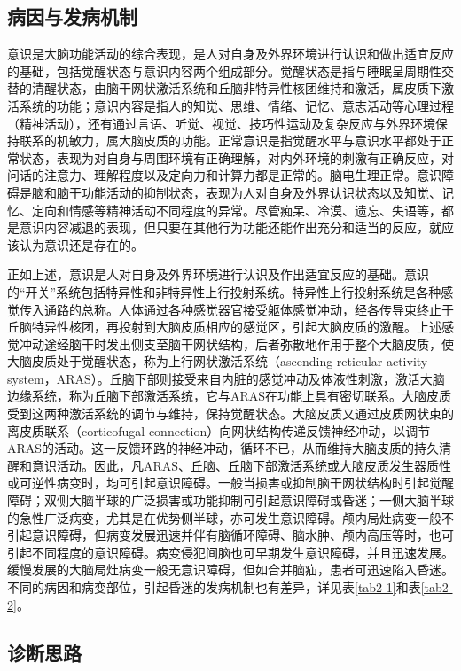 \subsection{病因与发病机制}

意识是大脑功能活动的综合表现，是人对自身及外界环境进行认识和做出适宜反应的基础，包括觉醒状态与意识内容两个组成部分。觉醒状态是指与睡眠呈周期性交替的清醒状态，由脑干网状激活系统和丘脑非特异性核团维持和激活，属皮质下激活系统的功能；意识内容是指人的知觉、思维、情绪、记忆、意志活动等心理过程（精神活动），还有通过言语、听觉、视觉、技巧性运动及复杂反应与外界环境保持联系的机敏力，属大脑皮质的功能。正常意识是指觉醒水平与意识水平都处于正常状态，表现为对自身与周围环境有正确理解，对内外环境的刺激有正确反应，对问话的注意力、理解程度以及定向力和计算力都是正常的。脑电生理正常。意识障碍是脑和脑干功能活动的抑制状态，表现为人对自身及外界认识状态以及知觉、记忆、定向和情感等精神活动不同程度的异常。尽管痴呆、冷漠、遗忘、失语等，都是意识内容减退的表现，但只要在其他行为功能还能作出充分和适当的反应，就应该认为意识还是存在的。

正如上述，意识是人对自身及外界环境进行认识及作出适宜反应的基础。意识的“开关”系统包括特异性和非特异性上行投射系统。特异性上行投射系统是各种感觉传入通路的总称。人体通过各种感觉器官接受躯体感觉冲动，经各传导束终止于丘脑特异性核团，再投射到大脑皮质相应的感觉区，引起大脑皮质的激醒。上述感觉冲动途经脑干时发出侧支至脑干网状结构，后者弥散地作用于整个大脑皮质，使大脑皮质处于觉醒状态，称为上行网状激活系统（ascending
reticular activity
system，ARAS）。丘脑下部则接受来自内脏的感觉冲动及体液性刺激，激活大脑边缘系统，称为丘脑下部激活系统，它与ARAS在功能上具有密切联系。大脑皮质受到这两种激活系统的调节与维持，保持觉醒状态。大脑皮质又通过皮质网状束的离皮质联系（corticofugal
connection）向网状结构传递反馈神经冲动，以调节ARAS的活动。这一反馈环路的神经冲动，循环不已，从而维持大脑皮质的持久清醒和意识活动。因此，凡ARAS、丘脑、丘脑下部激活系统或大脑皮质发生器质性或可逆性病变时，均可引起意识障碍。一般当损害或抑制脑干网状结构时引起觉醒障碍；双侧大脑半球的广泛损害或功能抑制可引起意识障碍或昏迷；一侧大脑半球的急性广泛病变，尤其是在优势侧半球，亦可发生意识障碍。颅内局灶病变一般不引起意识障碍，但病变发展迅速并伴有脑循环障碍、脑水肿、颅内高压等时，也可引起不同程度的意识障碍。病变侵犯间脑也可早期发生意识障碍，并且迅速发展。缓慢发展的大脑局灶病变一般无意识障碍，但如合并脑疝，患者可迅速陷入昏迷。不同的病因和病变部位，引起昏迷的发病机制也有差异，详见表\ref{tab2-1}和表\ref{tab2-2}。

\subsection{诊断思路}

